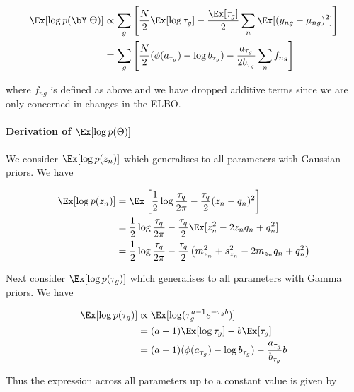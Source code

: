 \begin{equation}
\begin{aligned}
\Ex[ \log p(\bY | \Theta) ] & \propto \sum_g \left[ \frac{N}{2} \Ex[\log \tau_g] -
\frac{\Ex[\tau_g]}{2} \sum_n \Ex[ (y_{ng} - \mu_{ng})^2 ] \right] \\
& = \sum_g \left[
\frac{N}{2} (\phi(a_{\tau_g}) - \log b_{\tau_g}) - \frac{a_{\tau_g}}{2 b_{\tau_g}} \sum_n f_{ng}
\right]
\end{aligned}
\end{equation}

where $f_{ng}$ is defined as above and we have dropped additive terms since we are only concerned in changes in the ELBO.

\paragraph{Derivation of  $\Ex[\log p(\Theta)]$}

We consider $\Ex[\log p (z_n)]$ which generalises to all parameters with Gaussian priors. We have

\begin{equation}
\begin{aligned}
\Ex[\log p (z_n)] &= \Ex\left[ \frac{1}{2} \log \frac{\tau_q}{2 \pi} - \frac{\tau_q}{2} (z_n - q_n)^2 \right] \\
& = \frac{1}{2} \log \frac{\tau_q}{2 \pi} - \frac{\tau_q}{2} \Ex[ z_n^2 - 2 z_n q_n + q_n^2 ] \\
& = \frac{1}{2} \log \frac{\tau_q}{2 \pi} - \frac{\tau_q}{2} \left( m_{z_n}^2 + s_{z_n}^2 - 2 m_{z_n} q_n + q_n^2 \right)
\end{aligned}
\end{equation}

Next consider $\Ex[\log p (\tau_g)]$ which generalises to all parameters with Gamma priors. We have

\begin{equation}
\begin{aligned}
\Ex[\log p(\tau_g)] & \propto \Ex[\log(\tau_g^{a-1} e^{-\tau_g b})] \\
& = (a-1) \Ex[\log \tau_g] - b \Ex[\tau_g] \\
& = (a-1)(\phi(a_{\tau_g}) - \log b_{\tau_g}) - \frac{a_{\tau_g}}{b_{\tau_g}} b
\end{aligned}
\end{equation}

Thus the expression across all parameters up to a constant value is given by

